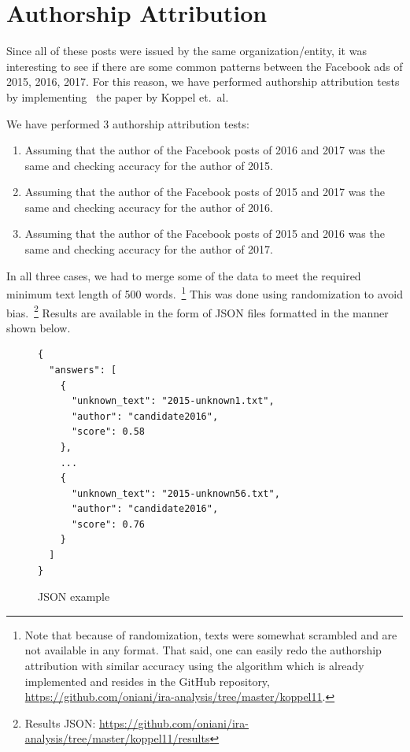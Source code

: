\documentclass[12pt]{article}
\theoremstyle{definition}
\begin{document}

\section*{\centering Authorship Attribution}

Since all of these posts were issued by the same organization/entity, it was
interesting to see if there are some common patterns between the Facebook ads
of 2015, 2016, 2017. For this reason, we have performed authorship attribution
tests by implementing~\cite{koppel11} the paper by Koppel et.~al.

\bigskip

We have performed 3 authorship attribution tests:

\begin{enumerate}
  \item Assuming that the author of the Facebook posts of 2016 and 2017 was the
        same and checking accuracy for the author of 2015.

  \item Assuming that the author of the Facebook posts of 2015 and 2017 was the
        same and checking accuracy for the author of 2016.

  \item Assuming that the author of the Facebook posts of 2015 and 2016 was the
        same and checking accuracy for the author of 2017.
\end{enumerate}

In all three cases, we had to merge some of the data to meet the required
minimum text length of 500 words.~\footnote{Note that because of randomization,
texts were somewhat scrambled and are not available in any format. That said,
one can easily redo the authorship attribution with similar accuracy using
the algorithm which is already implemented and resides in the GitHub repository,
\url{https://github.com/oniani/ira-analysis/tree/master/koppel11}.}
This was done using randomization to avoid bias.~\footnote{Results JSON:
\url{https://github.com/oniani/ira-analysis/tree/master/koppel11/results}}
Results are available in the form of JSON files formatted in the manner shown
below.

\begin{figure}[H]
\begin{verbatim}
{
  "answers": [
    {
      "unknown_text": "2015-unknown1.txt",
      "author": "candidate2016",
      "score": 0.58
    },
    ...
    {
      "unknown_text": "2015-unknown56.txt",
      "author": "candidate2016",
      "score": 0.76
    }
  ]
}
\end{verbatim}
\caption*{JSON example}
\end{figure}
\end{document}
